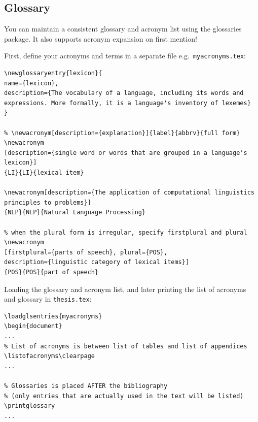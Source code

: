 \documentclass[a4paper,12pt]{scrartcl}
\begin{document}
\subsection{Glossary}\label{sec:glossary}
You can maintain a consistent glossary and acronym list using the \textsf{glossaries} package. It also supports acronym expansion on first mention! {\large\smiley}

First, define your acronyms and terms in a separate file e.g.~\texttt{myacronyms.tex}:

\medskip

\begin{lstlisting}[moretexcs={newacronym,newglossaryentry},basicstyle=\ttfamily\small,
emph={name,description,plural,firstplural},emphstyle=\bfseries]
% \newglossaryentry{label}{name={term},description={explanation}}
\newglossaryentry{lexicon}{
name={lexicon},
description={The vocabulary of a language, including its words and expressions. More formally, it is a language's inventory of lexemes}
}

% \newacronym[description={explanation}]{label}{abbrv}{full form}
\newacronym
[description={single word or words that are grouped in a language's lexicon}]
{LI}{LI}{lexical item}

\newacronym[description={The application of computational linguistics principles to problems}]
{NLP}{NLP}{Natural Language Processing}

% when the plural form is irregular, specify firstplural and plural
\newacronym
[firstplural={parts of speech}, plural={POS},
description={linguistic category of lexical items}]
{POS}{POS}{part of speech}
\end{lstlisting}

\bigskip

Loading the glossary and acronym list, and later printing the list of acronyms and glossary in \texttt{thesis.tex}:

\medskip

\begin{lstlisting}[moretexcs={loadglsentries,printglossaries,listofacronyms}]
% Must be loaded BEFORE \begin{document}!
\loadglsentries{myacronyms}
\begin{document}
...
% List of acronyms is between list of tables and list of appendices
\listofacronyms\clearpage
...

% Glossaries is placed AFTER the bibliography
% (only entries that are actually used in the text will be listed)
\printglossary
...
\end{lstlisting}
\end{document}

